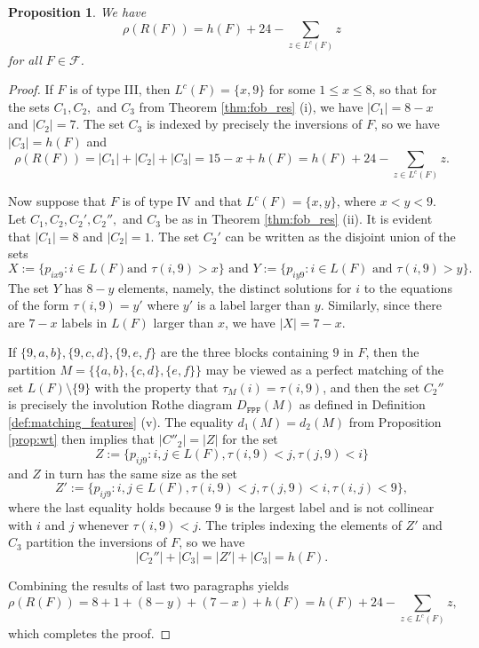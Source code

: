 \documentclass[10pt,a4paper]{amsart}
\newtheorem{prop}[theorem]{Proposition}
\numberwithin{equation}{section}
\newcommand{\lc}{L^c}
\newcommand{\calf}{\mathcal{F}}
\newcommand{\abs}[1]{\lvert #1 \rvert}
\begin{document}
\begin{prop}\label{prop:fob_level}
 We have
\[
\rho(R(F)) =h(F)+ 24 - \sum_{z\in\lc(F)} z \]
for all $F\in \calf$.
\end{prop}


\begin{proof}
  If $F$ is of type III, then $\lc(F)=\{x,9\}$ for some $1\le x\le 8$, so that
  for the sets $C_1, C_2,$ and $C_3$ from Theorem \ref{thm:fob_res} (i), we have
  $\abs{C_1}=8-x$
  and $\abs{C_2}=7$. 
  The set $C_3$ is indexed by precisely the inversions of $F$, so
  we have
  $\abs{C_3}=h(F)$ 
  and 
  \[
    \rho(R(F))=\abs{C_1}+\abs{C_2}+\abs{C_3}=15-x+h(F)=h(F)+24-\sum_{z\in\lc(F)}z.
  \]

  Now suppose that $F$ is of type IV and that $\lc(F)=\{x,y\}$, where $x<y<9$.
  Let $C_1, C_2, C_2', C_2'',$ and $C_3$ be as in Theorem \ref{thm:fob_res}
  (ii). It is evident that $\abs{C_1}=8$ and $\abs{C_2}=1$. The set $C_2'$ can
  be written as the disjoint union of the sets 
  \[X:=\{p_{ix9}: i\in L(F) \text{
    and } 
  \tau(i,9)>x\} \text{ and } Y:=\{p_{iy9}: i\in L(F) \text{ and }
\tau(i,9)>y\}.\] The set
  $Y$ has $8-y$ elements, namely, the distinct solutions for $i$ to the equations
  of the form $\tau(i,9)=y'$ where $y'$ is a label larger than
  $y$. Similarly, since there are $7-x$ labels in $L(F)$ larger than $x$, we have
  $\abs{X}=7-x$. 

  If $\{9,a,b\}, \{9,c,d\}, \{9,e,f\}$ are the three blocks
  containing $9$ in $F$, then the partition $M=\{\{a,b\}, \{c,d\}, \{e,f\}\}$
  may be viewed as a perfect matching of the set $L(F)\setminus\{9\}$ with the
  property that $\tau_M(i)=\tau(i,9)$, and then
  the set $C_2''$ is precisely the involution Rothe diagram $D_{\texttt{FPF}}(M)$ as defined
  in Definition \ref{def:matching_features} (v). The equality $d_1(M)=d_2(M)$
  from Proposition \ref{prop:wt} then implies that $\abs{C''_2}=\abs{Z}$ for the
  set
  \[
    Z:=\{p_{ij9}: i,j\in L(F), \tau(i,9)<j, \tau(j,9)<i\}
  \]
  and $Z$ in turn has the same size as the set
\[
  Z':= \{p_{ij9}: i,j\in L(F), \tau(i,9)<j, \tau(j,9)<i, \tau(i,j)<9\},
  \]
  where the last equality holds because $9$ is the largest label and is not
  collinear with $i$ and $j$ whenever $\tau(i,9)<j$. The triples indexing the elements of $Z'$ and $C_3$
  partition the inversions of $F$, so we have 
  \[
    \abs{C_2''}+\abs{C_3}=\abs{Z'}+\abs{C_3}=h(F).
  \]

  Combining the results of last two paragraphs yields
  \[
    \rho(R(F))=8+1+(8-y)+(7-x)+h(F)= h(F)+24-\sum_{z\in \lc(F)} z,
  \]
  which completes the proof. 
\end{proof}
\end{document}
